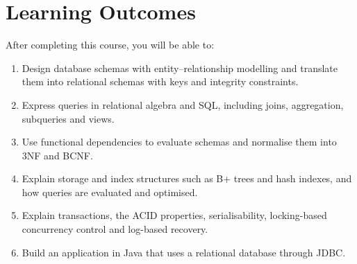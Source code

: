 \documentclass[11pt,a4paper]{article}
\begin{document}
\section{Learning Outcomes}
After completing this course, you will be able to:
\begin{enumerate}[label=LO\arabic*.]
  \item Design database schemas with entity--relationship modelling and translate them into relational schemas with keys and integrity constraints.
  \item Express queries in relational algebra and SQL, including joins, aggregation, subqueries and views.
  \item Use functional dependencies to evaluate schemas and normalise them into 3NF and BCNF.
  \item Explain storage and index structures such as B+ trees and hash indexes, and how queries are evaluated and optimised.
  \item Explain transactions, the ACID properties, serialisability, locking-based concurrency control and log-based recovery.
  \item Build an application in Java that uses a relational database through JDBC.
\end{enumerate}
\end{document}
